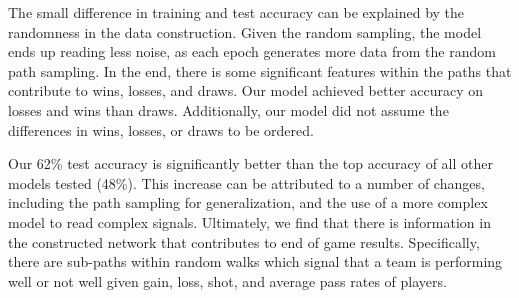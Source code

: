 The small difference in training and test accuracy can be explained by the randomness in the data construction. Given the random sampling, the model ends up reading less noise, as each epoch generates more data from the random path sampling. In the end, there is some significant features within the paths that contribute to wins, losses, and draws. Our model achieved better accuracy on losses and wins than draws. Additionally, our model did not assume the differences in wins, losses, or draws to be ordered. 

Our 62\% test accuracy is significantly better than the top accuracy of all other models tested (48\%). This increase can be attributed to a number of changes, including the path sampling for generalization, and the use of a more complex model to read complex signals. Ultimately, we find that there is information in the constructed network that contributes to end of game results. Specifically, there are sub-paths within random walks which signal that a team is performing well or not well given gain, loss, shot, and average pass rates of players. 




